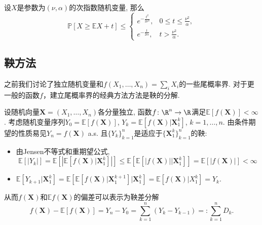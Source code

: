 \begin{theorem}[次指数随机变量的上偏差不等式]\label{thm:UpperDeviationOfSubExpRV}
	设$X$是参数为$(\nu, \alpha)$的次指数随机变量, 那么
	\begin{equation*}
		\mathbb{P}[X \geq \mathbb{E}X + t] \leq 
		\begin{cases}
			e^{-\frac{t^2}{2 \nu^2}}, & 0 \leq t \leq \frac{\nu^2}{\alpha}, \\
			e^{-\frac{t}{2 \alpha}}, & t > \frac{\nu^2}{\alpha}.
		\end{cases}
	\end{equation*}
\end{theorem}

\begin{theorem}[次高斯随机变量的等价定义]
	
\end{theorem}


\subsection{鞅方法}

之前我们讨论了独立随机变量和$f(X_1, \dots, X_n) = \sum_i X_i$的一些尾概率界. 对于更一般的函数$f$，建立尾概率界的经典方法方法是鞅的分解. 

设随机向量$\bm X = (X_1, \dots, X_n)$各分量独立, 函数$f \colon \R^n \to \R$满足$\mathbb{E}[f(\bm X)] < \infty$. 
考虑随机变量序列$Y_0 = \mathbb{E}[f(\bm X)]$, $Y_k = \mathbb{E}[f(\bm X)|\bm X_1^k]$, $k = 1, \dots, n$. 
由条件期望的性质易见$Y_n = f(\bm X)$ a.s. 且$\{Y_k\}_{k=1}^n$是适应于$\{\bm X_1^k\}_{k=1}^n$的鞅: 
\begin{itemize}
	\item 由Jensen不等式和重期望公式, 
		\begin{equation*}
			\mathbb{E}[|Y_k|]
			= \mathbb{E}\left[\left|\mathbb{E}[f(\bm X)|\bm X_1^k]\right|\right] 
			\leq \mathbb{E}\left[\mathbb{E}[|f(\bm X)||\bm X_1^k] \right]
			= \mathbb{E}[|f(\bm X)|]
			< \infty
		\end{equation*}
	\item $\mathbb{E}[Y_{k+1}|\bm X_1^k] = \mathbb{E}\left[\mathbb{E}[f(\bm X)|\bm X_1^{k+1}] \big|\bm X_1^k\right] = \mathbb{E}[f(\bm X) | X_1^k] = Y_k$. 
\end{itemize}
从而$f(\bm X)$和$\mathbb{E}f(\bm X)$的偏差可以表示为鞅差分解
\begin{equation*}
	f(\bm X) - \mathbb{E}[f(\bm X)] 
	= Y_n - Y_0 
	= \sum_{k=1}^n (Y_k - Y_{k-1})
	=: \sum_{k=1}^n D_k.
\end{equation*}

